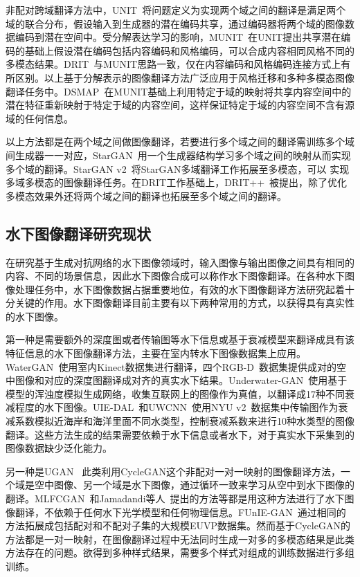 非配对跨域翻译方法中，UNIT~\cite{liu2017unsupervised}将问题定义为实现两个域之间的翻译是满足两个域的联合分布，假设输入到生成器的潜在编码共享，通过编码器将两个域的图像数据编码到潜在空间中。受分解表达学习的影响，MUNIT~\cite{huang2018multimodal}在UNIT提出共享潜在编码的基础上假设潜在编码包括内容编码和风格编码，可以合成内容相同风格不同的多模态结果。DRIT~\cite{lee2018diverse}与MUNIT思路一致，仅在内容编码和风格编码连接方式上有所区别。以上基于分解表示的图像翻译方法广泛应用于风格迁移和多种多模态图像翻译任务中。DSMAP~\cite{chang2020domain}在MUNIT基础上利用特定于域的映射将共享内容空间中的潜在特征重新映射于特定于域的内容空间，这样保证特定于域的内容空间不含有源域的任何信息。

以上方法都是在两个域之间做图像翻译，若要进行多个域之间的翻译需训练多个域间生成器一一对应，StarGAN~\cite{choi2018stargan}用一个生成器结构学习多个域之间的映射从而实现多个域的翻译。StarGAN v2~\cite{choi2020stargan}将StarGAN多域翻译工作拓展至多模态，可以 实现多域多模态的图像翻译任务。在DRIT工作基础上，DRIT++~\cite{lee2020drit++}被提出，除了优化多模态效果外还将两个域之间的翻译也拓展至多个域之间的翻译。


\subsection{水下图像翻译研究现状} 
在研究基于生成对抗网络的水下图像领域时，输入图像与输出图像之间具有相同的内容、不同的场景信息，因此水下图像合成可以称作水下图像翻译。在各种水下图像处理任务中，水下图像数据占据重要地位，有效的水下图像翻译方法研究起着十分关键的作用。水下图像翻译目前主要有以下两种常用的方式，以获得具有真实性的水下图像。

第一种是需要额外的深度图或者传输图等水下信息或基于衰减模型来翻译成具有该特征信息的水下图像翻译方法，主要在室内转水下图像数据集上应用。WaterGAN~\cite{li2017watergan}使用室内Kinect数据集进行翻译，四个RGB-D~\cite{janoch2013category,lai2014unsupervised,silberman2011indoor,shotton2013scene}数据集提供成对的空中图像和对应的深度图翻译成对齐的真实水下结果。Underwater-GAN~\cite{yu2018underwater}使用基于模型的浑浊度模拟生成网络，收集互联网上的图像作为真值，以翻译成17种不同衰减程度的水下图像。UIE-DAL~\cite{uplavikar2019all}和UWCNN~\cite{li2020underwater}使用NYU v2~\cite{silberman2012indoor}数据集中传输图作为衰减系数模拟近海岸和海洋里面不同水类型，控制衰减系数来进行10种水类型的图像翻译。这些方法生成的结果需要依赖于水下信息或者水下，对于真实水下采集到的图像数据缺少泛化能力。

另一种是UGAN~
\cite{fabbri2018enhancing}此类利用CycleGAN这个非配对一对一映射的图像翻译方法，一个域是空中图像、另一个域是水下图像，通过循环一致来学习从空中到水下图像的翻译。MLFCGAN~\cite{liu2019mlfCGAN}和Jamadandi等人~\cite{jamadandi2019exemplar}提出的方法等都是用这种方法进行了水下图像翻译，不依赖于任何水下光学模型和任何物理信息。FUnIE-GAN~\cite{islam2020fast}通过相同的方法拓展成包括配对和不配对子集的大规模EUVP数据集。然而基于CycleGAN的方法都是一对一映射，在图像翻译过程中无法同时生成一对多的多模态结果是此类方法存在的问题。欲得到多种样式结果，需要多个样式对组成的训练数据进行多组训练。

